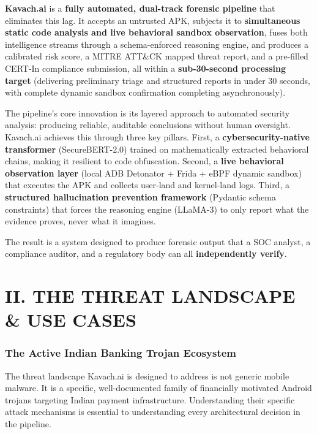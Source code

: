 \documentclass[10pt,a4paper]{article}
\begin{document}
\textbf{Kavach.ai} is a \textbf{fully automated, dual-track forensic pipeline} that eliminates this lag. It accepts an untrusted APK, subjects it to \textbf{simultaneous static code analysis and live behavioral sandbox observation}, fuses both intelligence streams through a schema-enforced reasoning engine, and produces a calibrated risk score, a MITRE ATT\&CK mapped threat report, and a pre-filled CERT-In compliance submission, all within a \textbf{sub-30-second processing target} (delivering preliminary triage and structured reports in under 30 seconds, with complete dynamic sandbox confirmation completing asynchronously).

The pipeline's core innovation is its layered approach to automated security analysis: producing reliable, auditable conclusions without human oversight. Kavach.ai achieves this through three key pillars. First, a \textbf{cybersecurity-native transformer} (SecureBERT-2.0) trained on mathematically extracted behavioral chains, making it resilient to code obfuscation. Second, a \textbf{live behavioral observation layer} (local ADB Detonator + Frida + eBPF dynamic sandbox) that executes the APK and collects user-land and kernel-land logs. Third, a \textbf{structured hallucination prevention framework} (Pydantic schema constraints) that forces the reasoning engine (LLaMA-3) to only report what the evidence proves, never what it imagines.

The result is a system designed to produce forensic output that a SOC analyst, a compliance auditor, and a regulatory body can all \textbf{independently verify}.

\section{II. THE THREAT LANDSCAPE \& USE CASES}

\subsubsection*{The Active Indian Banking Trojan Ecosystem}

The threat landscape Kavach.ai is designed to address is not generic mobile malware. It is a specific, well-documented family of financially motivated Android trojans targeting Indian payment infrastructure. Understanding their specific attack mechanisms is essential to understanding every architectural decision in the pipeline.
\end{document}
